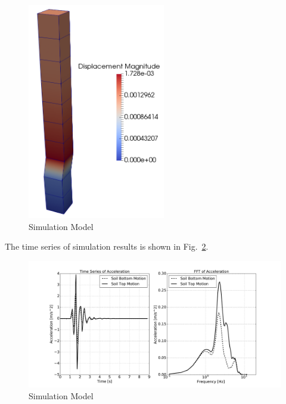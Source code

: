 \begin{figure}[H]
  \centering
  \includegraphics[width = 6cm]{./Figure-files/nonlinear_analysis_steps/free_field_1D/DRM1D_Motion3D.png}
  \caption{Simulation Model}
  \label{fig_decon_3D_motion_1D_model_results}
\end{figure}


The time series of simulation results is shown in Fig.~\ref{fig_decon_3D_motion_1D_model_results_top_bottom_time_series}.
\begin{figure}[H]
  \centering
  \includegraphics[width = 15cm]{./Figure-files/nonlinear_analysis_steps/free_field_1D/DRM1D_motion_node_5_x_acce_compare.pdf}
  \caption{Simulation Model}
  \label{fig_decon_3D_motion_1D_model_results_top_bottom_time_series}
\end{figure}

